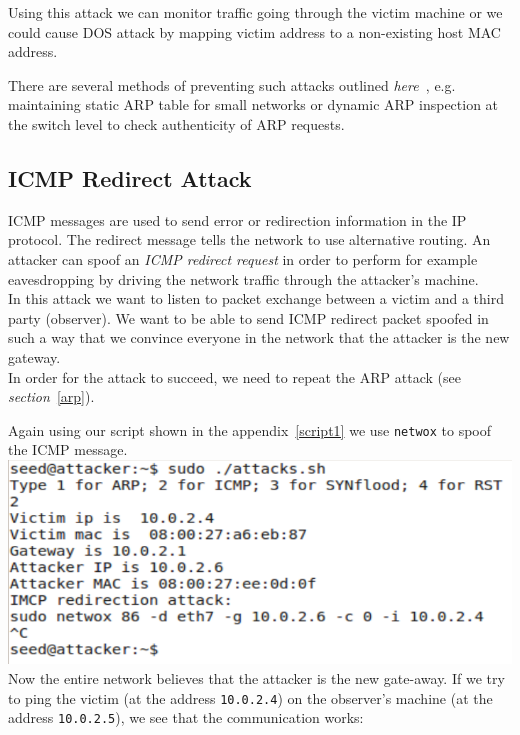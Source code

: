 \documentclass[12pt, a4paper]{article}
\begin{document}
Using this attack we can monitor traffic going through the victim machine or we could cause DOS attack by mapping victim address to a non-existing host MAC address.

There are several methods of preventing such attacks outlined \textit{here~\cite{blog}}, e.g. maintaining static ARP table for small networks or dynamic ARP inspection at the switch level to check authenticity of ARP requests.


\subsection{ICMP Redirect Attack}

ICMP messages are used to send error or redirection information in the IP protocol. The redirect message tells the network to use alternative routing. An attacker can spoof an \emph{ICMP redirect request} in order to perform for example eavesdropping by driving the network traffic through the attacker's machine.\\

In this attack we want to listen to packet exchange between a victim and a third party (observer). We want to be able to send ICMP redirect packet spoofed in such a way that we convince everyone in the network that the attacker is the new gateway.\\

In order for the attack to succeed, we need to repeat the ARP attack (see \emph{section}~\ref{arp}).

Again using our script shown in the appendix~\ref{script1} we use \texttt{netwox} to spoof the ICMP message.\\
\includegraphics[width=.95\textwidth]{gfx/imcp-netwox}\\


Now the entire network believes that the attacker is the new gate-away. If we try to ping the victim (at the address \texttt{10.0.2.4}) on the observer's machine (at the address \texttt{10.0.2.5}), we see that the communication works:\\
\end{document}
